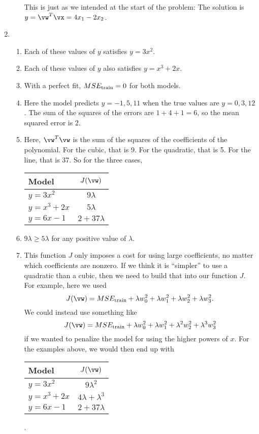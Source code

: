 \documentclass{article}
\newcommand{\strain}{_{\textnormal{train}}}
\begin{document}
\begin{enumerate}
\begin{enumerate}
    This is just as we intended at the start of the problem: The solution is $y = \vw^T\vx = 4x_1 - 2x_2$.
    \end{enumerate}
    
\item
\begin{enumerate}
    \item Each of these values of $y$ satisfies $y = 3x^2$.
    \item Each of these values of $y$ also satisfies $y = x^3 + 2x$.
    \item With a perfect fit, $MSE\strain = 0$ for both models.
    \item Here the model predicts $y = -1, 5, 11$ when the true values are $y = 0, 3, 12$. The sum of the squares of the errors are $1 + 4 + 1 = 6$, so the mean squared error is $2$.
    \item Here, $\vw^T\vw$ is the sum of the squares of the coefficients of the polynomial. For the cubic, that is 9. For the quadratic, that is 5. For the line, that is 37. So for the three cases,
    \begin{tabular}{l|c}
    Model & $J(\vw)$ \\
    \hline
    $y = 3x^2$     & $9\lambda$ \\
    $y = x^3 + 2x$ & $5\lambda$ \\
    $y = 6x - 1$   & $2 + 37\lambda$
    \end{tabular}
    \item $9\lambda \geq 5\lambda$ for any positive value of $\lambda$.
    \item This function $J$ only imposes a cost for using large coefficients, no matter which coefficients are nonzero. If we think it is ``simpler'' to use a quadratic than a cubic, then we need to build that into our function $J$. For example, here we used 
    \begin{equation*} J(\vw) = MSE\strain + \lambda w_0^2+\lambda w_1^2+\lambda w_2^2+\lambda w_3^2. \end{equation*}
    We could instead use something like
    \begin{equation*} J(\vw) = MSE\strain + \lambda w_0^2+\lambda w_1^2+ \lambda^2 w_2^2+ \lambda^3 w_3^2 \end{equation*}
    if we wanted to penalize the model for using the higher powers of $x$. For the examples above, we would then end up with

    \begin{tabular}{l|c}
    Model & $J(\vw)$ \\
    \hline
    $y = 3x^2$     & $9\lambda^2$ \\
    $y = x^3 + 2x$ & $4\lambda + \lambda^3$ \\
    $y = 6x - 1$   & $2 + 37\lambda$
    \end{tabular}.
    

\end{enumerate}
\end{enumerate}
\end{document}
